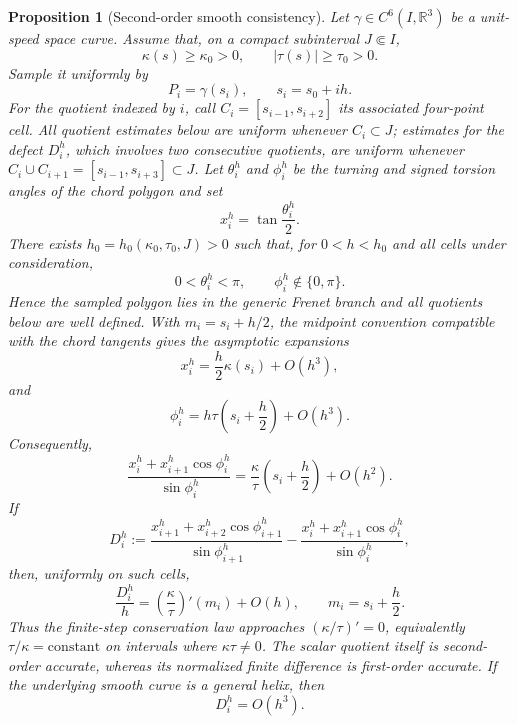 \documentclass[10pt,a4paper]{amsart}
\newtheorem{proposition}{Proposition}
\begin{document}
\begin{proposition}[Second-order smooth consistency]\label{prop:smooth-consistency}
Let \(\gamma\in C^6(I,\mathbb R^3)\) be a unit-speed space curve.
Assume that, on a compact subinterval \(J\Subset I\),
\[
\kappa(s)\ge \kappa_0>0,\qquad |\tau(s)|\ge\tau_0>0.
\]
Sample it uniformly by
\[
P_i=\gamma(s_i),\qquad s_i=s_0+ih.
\]
For the quotient indexed by $i$, call $C_i=[s_{i-1},s_{i+2}]$ its associated four-point cell. All quotient estimates below are uniform whenever $C_i\subset J$; estimates for the defect $D_i^h$, which involves two consecutive quotients, are uniform whenever $C_i\cup C_{i+1}=[s_{i-1},s_{i+3}]\subset J$.
Let \(\theta_i^h\) and \(\phi_i^h\) be the turning and signed torsion
angles of the chord polygon and set
\[
x_i^h=\tan\frac{\theta_i^h}{2}.
\]
There exists $h_0=h_0(\kappa_0,\tau_0,J)>0$ such that, for $0<h<h_0$ and all cells under consideration,
\[
0<\theta_i^h<\pi,\qquad \phi_i^h\notin\{0,\pi\}.
\]
Hence the sampled polygon lies in the generic Frenet branch and all quotients below are well defined.
With $m_i=s_i+h/2$, the midpoint convention compatible with the chord tangents gives the
asymptotic expansions
\[
x_i^h=\frac h2\kappa(s_i)+O(h^3),
\]
and
\[
\phi_i^h=h\tau\left(s_i+\frac h2\right)+O(h^3).
\]
Consequently,
\[
\frac{x_i^h+x_{i+1}^h\cos\phi_i^h}{\sin\phi_i^h}
=
\frac{\kappa}{\tau}\left(s_i+\frac h2\right)+O(h^2).
\]
If
\[
D_i^h:=
\frac{x_{i+1}^h+x_{i+2}^h\cos\phi_{i+1}^h}{\sin\phi_{i+1}^h}
-
\frac{x_i^h+x_{i+1}^h\cos\phi_i^h}{\sin\phi_i^h},
\]
then, uniformly on such cells,
\[
\boxed{
\frac{D_i^h}{h}
=
\left(\frac{\kappa}{\tau}\right)'(m_i)+O(h)
},
\qquad m_i=s_i+\frac h2.
\]
Thus the finite-step conservation law approaches $(\kappa/\tau)'=0$, equivalently \(\tau/\kappa=\mathrm{constant}\) on intervals where \(\kappa\tau\neq0\). The scalar quotient itself is second-order accurate, whereas its normalized finite difference is first-order accurate. If the underlying smooth curve is a general helix, then
\[
D_i^h=O(h^3).
\]
\end{proposition}
\end{document}
